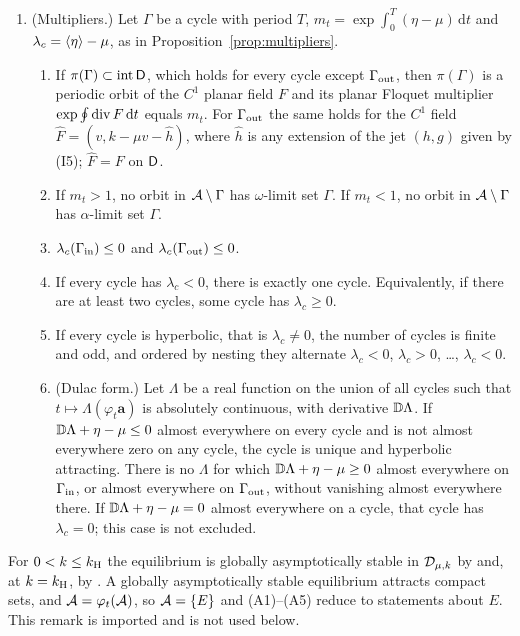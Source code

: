 \begin{theorem}
\begin{enumerate}[label=\textup{(A\arabic*)},resume]
\item \textup{(Multipliers.)} Let $\Gamma$ be a cycle with period $T$, $m_t=\exp\int_0^T(\eta-\mu)\,\mathrm dt$ and $\lambda_c=\left\langle \eta\right\rangle-\mu$, as in Proposition~\ref{prop:multipliers}.
\begin{enumerate}[label=\textup{(\alph*)}]
\item If $\pi(\Gamma)\subset\operatorname{int}\mathsf D$, which holds for every cycle except $\Gamma_{\rm out}$, then $\pi(\Gamma)$ is a periodic orbit of the $C^1$ planar field $F$ and its planar Floquet multiplier $\exp\oint\operatorname{div} F\,\mathrm dt$ equals $m_t$. For $\Gamma_{\rm out}$ the same holds for the $C^1$ field $\widehat F=(v,k-\mu v-\widehat h)$, where $\widehat h$ is any extension of the jet $(h,g)$ given by \textup{(I5)}; $\widehat F=F$ on $\mathsf D$.
\item If $m_t>1$, no orbit in $\mathcal A\setminus\Gamma$ has $\omega$-limit set $\Gamma$. If $m_t<1$, no orbit in $\mathcal A\setminus\Gamma$ has $\alpha$-limit set $\Gamma$.
\item $\lambda_c(\Gamma_{\rm in})\le0$ and $\lambda_c(\Gamma_{\rm out})\le0$.
\item If every cycle has $\lambda_c<0$, there is exactly one cycle. Equivalently, if there are at least two cycles, some cycle has $\lambda_c\ge0$.
\item If every cycle is hyperbolic, that is $\lambda_c\neq0$, the number of cycles is finite and odd, and ordered by nesting they alternate $\lambda_c<0$, $\lambda_c>0$, \dots, $\lambda_c<0$.
\item \textup{(Dulac form.)} Let $\Lambda$ be a real function on the union of all cycles such that $t\mapsto\Lambda(\varphi_t\mathbf a)$ is absolutely continuous, with derivative $\mathbb D\Lambda$. If $\mathbb D\Lambda+\eta-\mu\le0$ almost everywhere on every cycle and is not almost everywhere zero on any cycle, the cycle is unique and hyperbolic attracting. There is no $\Lambda$ for which $\mathbb D\Lambda+\eta-\mu\ge0$ almost everywhere on $\Gamma_{\rm in}$, or almost everywhere on $\Gamma_{\rm out}$, without vanishing almost everywhere there. If $\mathbb D\Lambda+\eta-\mu=0$ almost everywhere on a cycle, that cycle has $\lambda_c=0$; this case is not excluded.
\end{enumerate}
\end{enumerate}
\end{theorem}
For $0<k\le k_{\mathrm H}$ the equilibrium is globally asymptotically stable in $\mathcal D_{\mu,k}$ by \cite[Theorem~1.1(b)]{Smith12} and, at $k=k_{\mathrm H}$, by \cite[Theorem~13]{BH23}. A globally asymptotically stable equilibrium attracts compact sets, and $\mathcal A=\varphi_t(\mathcal A)$, so $\mathcal A=\{E\}$ and (A1)--(A5) reduce to statements about $E$. This remark is imported and is not used below.

